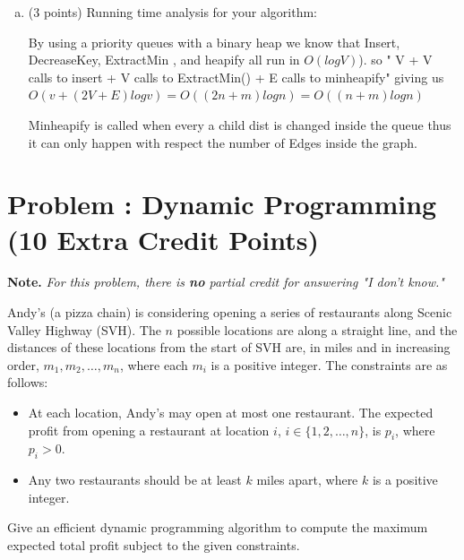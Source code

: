 \documentclass[12pt]{amsart}
\newcounter{pNum}
\newcommand{\problem}[2]{\addtocounter{pNum}{1}
\section*{Problem \arabic{pNum}: #1 (#2 Points)}}
\begin{document}
\begin{enumerate}[(a)]
\vfill

\item (3 points)
Running time analysis for your algorithm:


By using a priority queues with a binary heap we know that 
Insert, DecreaseKey, ExtractMin , and heapify all run in $O(logV)$). so " V  + V calls to insert + V calls to ExtractMin() + E calls to minheapify" giving us $O(v +(2V+E)logv) = O((2n+m)logn) = O((n+m)logn)$

Minheapify is called when every a child dist is changed inside the queue thus it can only happen with respect the number of Edges inside the graph. 

\vfill

\end{enumerate}

\newpage

\problem{Dynamic Programming}{10 Extra Credit}

\begin{framed}
\begin{center}
\textbf{Note.}  \emph{For this problem, there is \textbf{no} partial credit for answering "I don't know."}
\end{center}
\end{framed}

\medskip

Andy's (a pizza chain) is considering opening a series of restaurants along Scenic Valley Highway (SVH). The $n$ possible locations are along a straight line, and the distances of these locations from the start of SVH are, in miles and in increasing order, $m_1, m_2, \dots , m_n$, where each $m_i$ is a positive integer. The constraints are as follows:
 \begin{itemize}
\item At each location, Andy's may open at most one restaurant. The expected profit from opening a restaurant at location $i$, $i \in \{1,2, \dots , n\}$, is $p_i$, where $p_i > 0$.
\item Any two restaurants should be at least $k$ miles apart, where $k$ is a positive integer.
\end{itemize}

Give an efficient dynamic programming algorithm to compute the maximum expected total profit subject to the given constraints.
\end{document}

